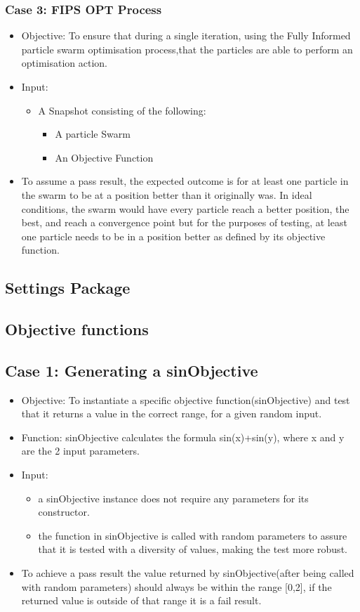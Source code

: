 \documentclass[11pt]{article}
\begin{document}
\subsubsection{Case 3: FIPS OPT Process}
\begin{itemize}
    \item Objective: To ensure that during a single iteration, using the Fully Informed particle swarm optimisation process,that the particles are able to perform an optimisation action.
    \item Input: \begin{itemize}
    \item A Snapshot consisting of the following:
    	\begin{itemize}
    	\item A particle Swarm
    	\item An Objective Function
    	\end{itemize}
    \end{itemize}
    \item To assume a pass result, the expected outcome is for at least one particle in the swarm to be at a position better than it originally was. In ideal conditions, the swarm would have every particle reach a better position, the best, and reach a convergence point but for the purposes of testing, at least one particle needs to be in a position better as defined by its objective function.
\end{itemize}
\subsection{Settings Package}

\subsection{Objective functions}
\subsection{Case 1: Generating a sinObjective}
\begin{itemize}
    \item Objective: To instantiate a specific objective function(sinObjective) and test that it returns a value in the correct range, for a given random input.
    \item Function: sinObjective calculates the formula sin(x)+sin(y), where x and y are the 2 input parameters.
    \item Input:\begin{itemize}
        \item a sinObjective instance does not require any parameters for its constructor.
        \item the function in sinObjective is called with random parameters to assure that it is tested with a diversity of values, making the test more robust.
        \end{itemize}
    \item To achieve a pass result the value returned by sinObjective(after being called with random parameters) should always be within the range [0,2], if the returned value is outside of that range it is a fail result.
\end{itemize}
\end{document}
